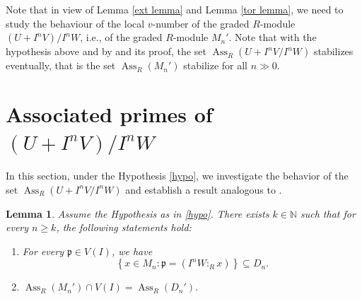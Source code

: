 \documentclass[11pt,reqno]{amsart}
\newtheorem{lemma}[theorem]{Lemma}
\theoremstyle{definition}
\newtheorem{notation}[theorem]{Notation}
\newcommand{\p}{\mathfrak{p}}
\newcommand{\Ass}{\operatorname{Ass}}
\begin{document}
Note that in view of Lemma \ref{ext lemma} and Lemma \ref{tor lemma}, we need to study the behaviour of the local $v$-number of the graded $R$-module $(U+I^nV)/I^nW$, i.e., of the graded $R$-module $M_n'$. Note that with the hypothesis above and by \cite[Proposition 3.4]{KW04} and its proof, the set $\Ass_R \left(U+I^nV/I^nW\right)$ stabilizes eventually, that is the set $\Ass_R(M_n')$ stabilize for all $n\gg0.$












\section{Associated primes of \texorpdfstring{$(U+I^nV)/I^nW$}{(U+InV)/InW}} 


In this section, under the Hypothesis \ref{hypo}, we investigate the behavior of the set $\Ass_R \left(U+I^nV/I^nW\right)$ and establish a result analogous to \cite[Theorem 2.2]{GNP26}.

\begin{lemma}\label{lem1}
Assume the Hypothesis as in \ref{hypo}.
There exists $k\in\mathbb{N}$ such that for every
$n\geq k$, the following statements hold:
\begin{enumerate}[label=(\alph*), font=\upshape]
    \item For every $\p\in V(I)$, we have
\[ \left\{ x\in M_n : \p=(I^nW:_R x) \right\}
\subseteq
D_n.\]

\item $\Ass_R(M_n')\cap V(I)=\Ass_R(D_n').
$

\end{enumerate}
\end{lemma}
\end{document}
